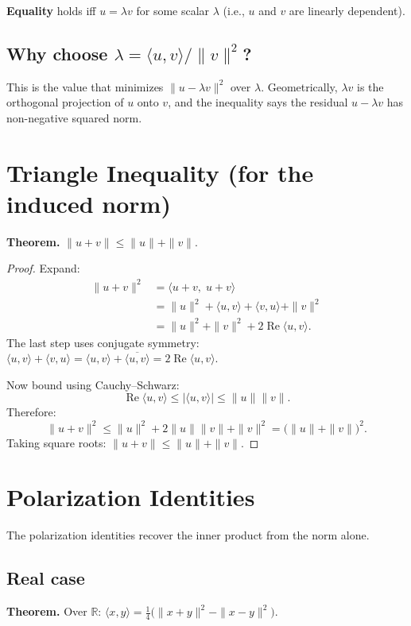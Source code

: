 \documentclass[12pt]{article}
\begin{document}
\textbf{Equality} holds iff $u = \lambda v$ for some scalar $\lambda$ (i.e., $u$ and $v$ are linearly dependent).

\subsection{Why choose $\lambda = \langle u,v\rangle / \|v\|^2$?}

This is the value that minimizes $\|u - \lambda v\|^2$ over $\lambda$. Geometrically, $\lambda v$ is the orthogonal projection of $u$ onto $v$, and the inequality says the residual $u - \lambda v$ has non-negative squared norm.

\section{Triangle Inequality (for the induced norm)}

\textbf{Theorem.} $\|u + v\| \le \|u\| + \|v\|$.

\begin{proof}
Expand:
\begin{align*}
\|u+v\|^2 &= \langle u+v,\; u+v\rangle \\
&= \|u\|^2 + \langle u,v\rangle + \langle v,u\rangle + \|v\|^2 \\
&= \|u\|^2 + \|v\|^2 + 2\operatorname{Re}\langle u,v\rangle.
\end{align*}
The last step uses conjugate symmetry: $\langle u,v\rangle + \langle v,u\rangle = \langle u,v\rangle + \overline{\langle u,v\rangle} = 2\operatorname{Re}\langle u,v\rangle$.

Now bound using Cauchy--Schwarz:
\[
\operatorname{Re}\langle u,v\rangle \le |\langle u,v\rangle| \le \|u\|\|v\|.
\]
Therefore:
\[
\|u+v\|^2 \le \|u\|^2 + 2\|u\|\|v\| + \|v\|^2 = \bigl(\|u\| + \|v\|\bigr)^2.
\]
Taking square roots: $\|u+v\| \le \|u\| + \|v\|$.
\end{proof}

\section{Polarization Identities}

The polarization identities recover the inner product from the norm alone.

\subsection{Real case}

\textbf{Theorem.} Over $\mathbb{R}$: $\displaystyle\langle x,y\rangle = \frac{1}{4}\bigl(\|x+y\|^2 - \|x-y\|^2\bigr)$.
\end{document}
